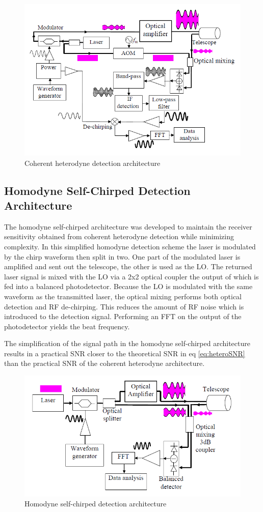 \begin{figure}[H]
	\centering
	\includegraphics[width=0.8\columnwidth]{figs/heterodyne}
	\vspace{1em}
	\caption{Coherent heterodyne detection architecture}
	\label{fig:heterodyneBlock}
\end{figure}


\subsection{Homodyne Self-Chirped Detection Architecture}
The homodyne self-chirped architecture was developed to maintain the receiver sensitivity obtained from coherent
heterodyne detection while minimizing complexity. In this simplified homodyne detection scheme the laser is 
modulated by the chirp waveform then split in two. One part of the modulated laser is amplified and sent out the
telescope, the other is used as the LO. The returned laser signal is mixed with the LO via a 2x2 optical coupler
the output of which is fed into a balanced photodetector. Because the LO is modulated with the same waveform as 
the transmitted laser, the optical mixing performs both optical detection and RF de-chirping. This reduces the 
amount of RF noise which is introduced to the detection signal. Performing an FFT on the output of the photodetector
yields the beat frequency. 

The simplification of the signal path in the homodyne self-chirped architecture results in a practical SNR closer
to the theoretical SNR in eq \ref{eq:heteroSNR} than the practical SNR of the coherent heterodyne architecture. 

\begin{figure}[H]
	\centering
	\includegraphics[width=0.8\columnwidth]{figs/simpleHomodyne}
	\vspace{1em}
	\caption{Homodyne self-chirped detection architecture}
	\label{fig:homodyneBlock}
\end{figure}

